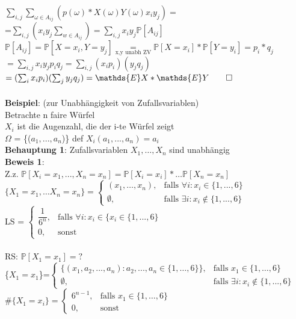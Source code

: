 $\sum_{i,j}\sum_{\omega\in A_{ij}} (p(\omega)*X(\omega)Y(\omega)x_iy_j)=$\medskip\\
=$\sum_{i,j}(x_iy_j\sum_{w\in A_{ij}})=\sum_{i,j}x_iy_j\mathds{P}[A_{ij}]$\medskip\\
$\mathds{P}[A_{ij}]=\mathds{P}[X=x_i, Y=y_j] \underset{\text{x,y unabh ZV}}{=} \mathds{P}[X=x_i]*\mathds{P}[Y=y_i]=p_i*q_j$\bigskip\\
$=\sum_{i,j}x_iy_jp_iq_j = \sum_{i,j}(x_ip_i)(y_jq_j)$\medskip\\
$=(\sum_ix_ip_i)(\sum_jy_jq_j) = \mathds{E}X*\mathds{E}Y \qed$\\\\
\textbf{Beispiel}: (zur Unabhängigkeit von Zufallsvariablen)\\
Betrachte n faire Würfel\smallskip\\
$X_i$ ist die Augenzahl, die der i-te Würfel zeigt\smallskip\\
 $\Omega$ = \{($a_1,...,a_n$)\} def $X_i(a_1,...,a_n) = a_i$\medskip\\
 \textbf{Behauptung 1}: Zufallsvariablen $X_1,\dots,X_n$ sind unabhängig\medskip\\
 \textbf{Beweis 1}:\\
 Z.z. $\mathds{P}[X_i = x_1,...,X_n=x_n] = \mathds{P}[X_i=x_i]*\dots\mathds{P}[X_n=x_n]$\medskip\\
$\{X_1 = x_1,\dots X_n = x_n\}=
\begin{cases}
(x_1,\dots,x_n), &\text{falls }\forall i:x_i \in \{1,...,6\}\\
\emptyset, & \text{falls } \exists i : x_i \notin \{1,...,6\}
\end{cases}$\smallskip\\
LS = $
\begin{cases}
\dfrac{1}{6^n},&\text{falls } \forall i: x_i \in \{x_i \in \{1,...,6\}\\
0,&\text{sonst}
\end{cases}$\\\\
RS: $\mathds{P}[X_1=x_1] = ?$\medskip\\
\{$X_1=x_1$\}=$\begin{cases}
\{(x_1,a_2,...,a_n):a_2,...,a_n \in \{1,\dots,6\}\}, &\text{falls }x_1 \in \{1,\dots,6\}\\
\emptyset, & \text{falls } \exists i : x_i \notin \{1,...,6\}
\end{cases}$\medskip\\
$\#\{X_1=x_i\}=\begin{cases}
6^{n-1},&\text{falls }x_1\in \{1,\dots,6\}\\
0,&\text{sonst}
\end{cases}$\medskip\\
